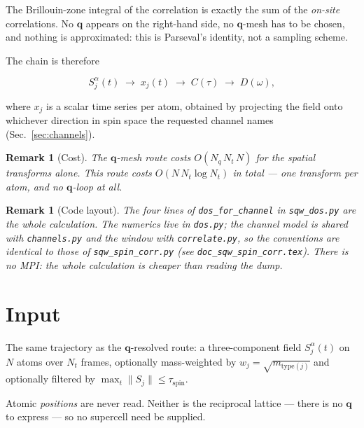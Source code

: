 \documentclass[12pt, a4paper, oneside]{article}
\newtheorem{remark}[theorem]{Remark}
\newcommand{\qvec}{\mathbf{q}}
\newcommand{\Nt}{N_t}
\newcommand{\Na}{N}
\newcommand{\field}{S}
\begin{document}
The Brillouin-zone integral of the correlation is exactly the sum of the
\emph{on-site} correlations. No $\qvec$ appears on the right-hand side, no
$\qvec$-mesh has to be chosen, and nothing is approximated: this is Parseval's
identity, not a sampling scheme.

The chain is therefore

\begin{equation}
    \field_j^\alpha(t) \;\longrightarrow\; x_j(t)
    \;\longrightarrow\; C(\tau) \;\longrightarrow\; D(\omega),
\end{equation}

where $x_j$ is a scalar time series per atom, obtained by projecting the field
onto whichever direction in spin space the requested channel names
(Sec.~\ref{sec:channels}).

\begin{remark}[Cost]
The $\qvec$-mesh route costs $O(N_q\,\Nt\,\Na)$ for the spatial transforms
alone. This route costs $O(\Na\,\Nt\log\Nt)$ in total --- one transform per
atom, and no $\qvec$-loop at all.
\end{remark}

\begin{remark}[Code layout]
The four lines of \texttt{dos\_for\_channel} in \texttt{sqw\_dos.py} are the
whole calculation. The numerics live in \texttt{dos.py}; the channel model is
shared with \texttt{channels.py} and the window with \texttt{correlate.py}, so
the conventions are identical to those of \texttt{sqw\_spin\_corr.py} (see
\texttt{doc\_sqw\_spin\_corr.tex}). There is no MPI: the whole calculation is
cheaper than reading the dump.
\end{remark}

\section{Input}

The same trajectory as the $\qvec$-resolved route: a three-component field
$\field_j^\alpha(t)$ on $\Na$ atoms over $\Nt$ frames, optionally mass-weighted
by $w_j = \sqrt{m_{\text{type}(j)}}$ and optionally filtered by
$\max_t\lVert\field_j\rVert \le \tau_{\text{spin}}$.

Atomic \emph{positions} are never read. Neither is the reciprocal lattice ---
there is no $\qvec$ to express --- so no supercell need be supplied.
\end{document}
